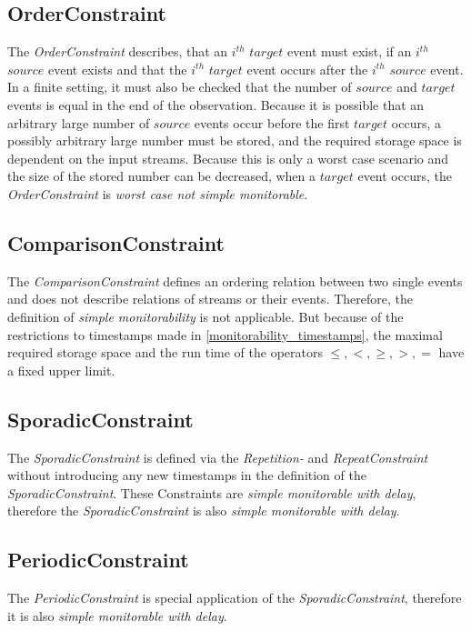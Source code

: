 \subsection{OrderConstraint}
	The \emph{OrderConstraint} describes, that an $i^{th}$ $target$ event must exist, if an $i^{th}$ $source$ event exists and that the $i^{th}$ $target$ event occurs after the $i^{th}$ $source$ event. In a finite setting, it must also be checked that the number of $source$ and $target$ events is equal in the end of the observation. Because it is possible that an arbitrary large number of $source$ events occur before the first $target$ occurs, a possibly arbitrary large number must be stored, and the required storage space is dependent on the input streams.  Because this is only a worst case scenario and the size of the stored number can be decreased, when a $target$ event occurs, the \emph{OrderConstraint} is \textit{worst case not simple monitorable}.
	
\subsection{ComparisonConstraint}
	The \textit{ComparisonConstraint} defines an ordering relation between two single events and does not describe relations of streams or their events. Therefore, the definition of \textit{simple monitorability} is not applicable. But because of the restrictions to timestamps made in \ref{monitorability_timestamps}, the maximal required storage space and the run time of the operators $\leq, <, \geq, >, =$ have a fixed upper limit.
	
\subsection{SporadicConstraint}
	The \emph{SporadicConstraint} is defined via the \emph{Repetition-} and \emph{RepeatConstraint} without introducing any new timestamps in the definition of the \emph{SporadicConstraint}. These Constraints are \textit{simple monitorable with delay}, therefore the \emph{SporadicConstraint} is also \textit{simple monitorable with delay}.
	
\subsection{PeriodicConstraint}
	The \emph{PeriodicConstraint} is special application of the \emph{SporadicConstraint}, therefore it is also \textit{simple monitorable with delay}.
	
